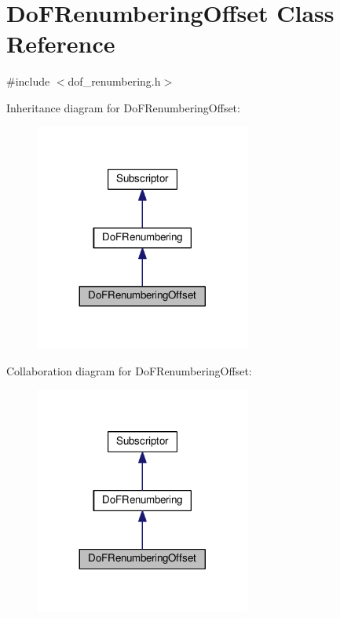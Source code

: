 \hypertarget{class_do_f_renumbering_offset}{}\section{Do\+F\+Renumbering\+Offset Class Reference}
\label{class_do_f_renumbering_offset}


{\ttfamily \#include $<$dof\+\_\+renumbering.\+h$>$}



Inheritance diagram for Do\+F\+Renumbering\+Offset\+:
\nopagebreak
\begin{figure}[H]
\begin{center}
\leavevmode
\includegraphics[width=200pt]{class_do_f_renumbering_offset__inherit__graph}
\end{center}
\end{figure}


Collaboration diagram for Do\+F\+Renumbering\+Offset\+:
\nopagebreak
\begin{figure}[H]
\begin{center}
\leavevmode
\includegraphics[width=200pt]{class_do_f_renumbering_offset__coll__graph}
\end{center}
\end{figure}
